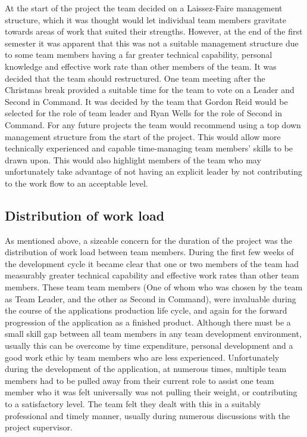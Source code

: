 At the start of the project the team decided on a Laissez-Faire management
structure, which it was thought would let individual team members gravitate
towards areas of work that suited their strengths. However, at the end of the
first semester it was apparent that this was not a suitable management
structure due to some team members having a far greater technical capability,
personal knowledge and effective work rate than other members of the team. It
was decided that the team should restructured. One team meeting after the
Christmas break provided a suitable time for the team to vote on a Leader and
Second in Command. It was decided by the team that Gordon Reid would be
selected for the role of team leader and Ryan Wells for the role of Second in
Command. For any future projects the team would recommend using a top down
management structure from the start of the project. This would allow more
technically experienced and capable time-managing team members' skills to be
drawn upon. This would also highlight members of the team who may  unfortunately
take advantage of not having an explicit leader by not  contributing to the work
flow to an acceptable level.

\subsection{Distribution of work load}

As mentioned above, a sizeable concern for the duration of the project was the
distribution of work load between team members. During the first few weeks of
the development cycle it became clear that one or two members of the team had
measurably greater technical capability and effective work rates than other
team members. These team team members (One of whom who was chosen by the team
as Team Leader, and the other as Second in Command), were invaluable during  the
course of the applications production life cycle, and again for the  forward
progression of the application as a finished product. Although there  must be a
small skill gap between all team members in any team development  environment,
usually this can be overcome by time expenditure, personal  development and a
good work ethic by team members who are less experienced.  Unfortunately during
the development of the application, at numerous times,  multiple team members
had to be pulled away from their current role to assist  one team member who it
was felt universally was not pulling their weight, or  contributing to a
satisfactory level. The team felt they dealt with this in a  suitably
professional and timely manner, usually during numerous discussions  with the
project supervisor.

